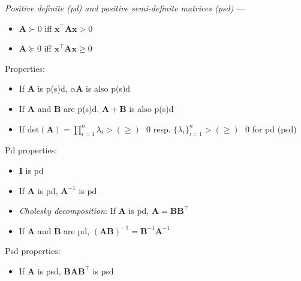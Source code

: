 \emph{Positive definite (pd) and positive semi-definite matrices (psd)} --- 
\begin{multicols}{2}
\begin{itemize}
    \item $\boldsymbol{A} \succ 0$ iff $\boldsymbol{x}^\intercal\boldsymbol{A}\boldsymbol{x} > 0$
    \item $\boldsymbol{A} \succeq 0$ iff $\boldsymbol{x}^\intercal\boldsymbol{A}\boldsymbol{x} \geq 0$
\end{itemize}
\end{multicols}
Properties:
\begin{itemize}
    \item If $\boldsymbol{A}$ is p(s)d, $\alpha\boldsymbol{A}$ is also p(s)d
    \item If $\boldsymbol{A}$ and $\boldsymbol{B}$ are p(s)d, $\boldsymbol{A} + \boldsymbol{B}$ is also p(s)d
    \item If $\textrm{det}(\boldsymbol{A}) = \prod_{i=1}^n \lambda_i > (\geq) \textrm{ } 0$ resp. $\{\lambda_i\}_{i=1}^n > (\geq) \textrm{ } 0$ for pd (psd)
\end{itemize}
Pd properties:
\begin{itemize}
    \item $\boldsymbol{I}$ is pd
    \item If $\boldsymbol{A}$ is pd, $\boldsymbol{A}^{-1}$ is pd
    \item \emph{Cholesky decomposition}: If $\boldsymbol{A}$ is pd, $\boldsymbol{A} = \boldsymbol{B}\boldsymbol{B}^\intercal$
    \item If $\boldsymbol{A}$ and $\boldsymbol{B}$ are pd, $(\boldsymbol{A}\boldsymbol{B})^{-1} = \boldsymbol{B}^{-1}\boldsymbol{A}^{-1}$
\end{itemize}
Psd properties:
\begin{itemize}
    \item If $\boldsymbol{A}$ is psd, $\boldsymbol{B}\boldsymbol{A}\boldsymbol{B}^\intercal$ is psd
\end{itemize}